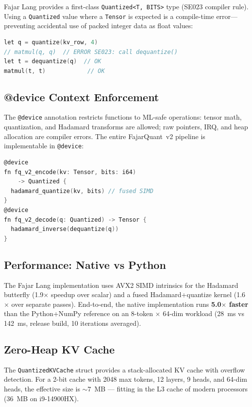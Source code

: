 \documentclass[10pt,twocolumn]{article}
\begin{document}
Fajar Lang provides a first-class \texttt{Quantized<T, BITS>} type
(SE023 compiler rule). Using a \texttt{Quantized} value where a
\texttt{Tensor} is expected is a compile-time error---preventing
accidental use of packed integer data as float values:

\begin{lstlisting}[language=C,caption={SE023: Quantized type safety}]
let q = quantize(kv_row, 4)
// matmul(q, q)  // ERROR SE023: call dequantize()
let t = dequantize(q)  // OK
matmul(t, t)            // OK
\end{lstlisting}

\subsection{@device Context Enforcement}

The \texttt{@device} annotation restricts functions to ML-safe
operations: tensor math, quantization, and Hadamard transforms are
allowed; raw pointers, IRQ, and heap allocation are compiler errors.
The entire FajarQuant~v2 pipeline is implementable in \texttt{@device}:

\begin{lstlisting}[language=C,caption={Full v2 pipeline in @device context}]
@device
fn fq_v2_encode(kv: Tensor, bits: i64)
    -> Quantized {
  hadamard_quantize(kv, bits) // fused SIMD
}
@device
fn fq_v2_decode(q: Quantized) -> Tensor {
  hadamard_inverse(dequantize(q))
}
\end{lstlisting}

\subsection{Performance: Native vs Python}

The Fajar Lang implementation uses AVX2 SIMD intrinsics for the
Hadamard butterfly (1.9$\times$ speedup over scalar) and a fused
Hadamard+quantize kernel (1.6$\times$ over separate passes). End-to-end,
the native implementation runs \textbf{5.0$\times$ faster} than the
Python+NumPy reference on an 8-token $\times$ 64-dim workload
(28~ms vs 142~ms, release build, 10 iterations averaged).

\subsection{Zero-Heap KV Cache}

The \texttt{QuantizedKVCache} struct provides a stack-allocated KV cache
with overflow detection. For a 2-bit cache with 2048 max tokens, 12
layers, 9 heads, and 64-dim heads, the effective size is ${\sim}7$~MB
--- fitting in the L3 cache of modern processors (36~MB on i9-14900HX).
\end{document}
